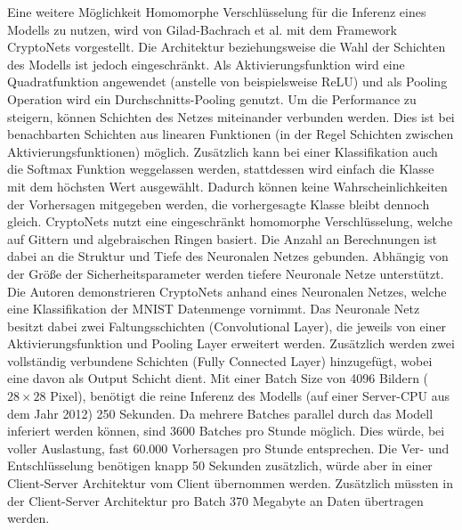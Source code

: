 Eine weitere Möglichkeit Homomorphe Verschlüsselung für die Inferenz eines Modells zu nutzen, wird von Gilad-Bachrach et al. mit dem Framework CryptoNets \cite{P-54} vorgestellt.
Die Architektur beziehungsweise die Wahl der Schichten des Modells ist jedoch eingeschränkt. 
Als Aktivierungsfunktion wird eine Quadratfunktion angewendet (anstelle von beispielsweise ReLU) und als Pooling Operation wird ein Durchschnitts-Pooling genutzt.
Um die Performance zu steigern, können Schichten des Netzes miteinander verbunden werden. 
Dies ist bei benachbarten Schichten aus linearen Funktionen (in der Regel Schichten zwischen Aktivierungsfunktionen) möglich.
Zusätzlich kann bei einer Klassifikation auch die Softmax Funktion weggelassen werden, stattdessen wird einfach die Klasse mit dem höchsten Wert ausgewählt. 
Dadurch können keine Wahrscheinlichkeiten der Vorhersagen mitgegeben werden, die vorhergesagte Klasse bleibt dennoch gleich.
CryptoNets nutzt eine eingeschränkt homomorphe Verschlüsselung, welche auf Gittern und algebraischen Ringen basiert. 
Die Anzahl an Berechnungen ist dabei an die Struktur und Tiefe des Neuronalen Netzes gebunden.
Abhängig von der Größe der Sicherheitsparameter werden tiefere Neuronale Netze unterstützt.
Die Autoren demonstrieren CryptoNets anhand eines Neuronalen Netzes, welche eine Klassifikation der MNIST Datenmenge \cite{D-MNIST} vornimmt.
Das Neuronale Netz besitzt dabei zwei Faltungsschichten (Convolutional Layer), die jeweils von einer Aktivierungsfunktion und Pooling Layer erweitert werden.
Zusätzlich werden zwei vollständig verbundene Schichten (Fully Connected Layer) hinzugefügt, wobei eine davon als Output Schicht dient.
Mit einer Batch Size von 4096 Bildern ($28 \times 28$ Pixel), benötigt die reine Inferenz des Modells (auf einer Server-CPU aus dem Jahr 2012) 250 Sekunden.
Da mehrere Batches parallel durch das Modell inferiert werden können, sind 3600 Batches pro Stunde möglich. 
Dies würde, bei voller Auslastung, fast 60.000 Vorhersagen pro Stunde entsprechen.
Die Ver- und Entschlüsselung benötigen knapp 50 Sekunden zusätzlich, würde aber in einer Client-Server Architektur vom Client übernommen werden.
Zusätzlich müssten in der Client-Server Architektur pro Batch 370 Megabyte an Daten übertragen werden.

